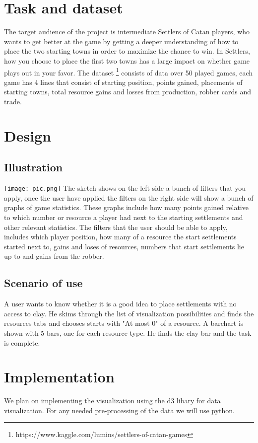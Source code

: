 \documentclass{article}
\begin{document}
\section{Task and dataset}

The target audience of the project is intermediate Settlers of Catan
players, who wants to get better at the game by getting a deeper understanding
of how to place the two starting towns in order to maximize the chance
to win. In Settlers, how you choose to place the first two towns has
a large impact on whether game plays out in your favor. The dataset
\footnote{https://www.kaggle.com/lumins/settlers-of-catan-games} consists of
data over 50 played games, each game has 4 lines that consist of starting
position, points gained, placements of starting towns, total resource gains
and losses from production, robber cards and trade.

\section{Design}

\subsection{Illustration}
\texttt{[image: pic.png]}
\newpage
\noindent
The sketch shows on the left side a bunch of filters that you apply, once the user
have applied the filters on the right side will show a bunch of graphs of game statistics.
These graphs include how many points gained relative to which number or resource a player
had next to the starting settlements and other relevant statistics.
The filters that the user should be able to apply, includes which player position,
how many of a resource the start settlements started next to, gains and loses of resources,
numbers that start settlements lie up to and gains from the robber.

\subsection{Scenario of use}

A user wants to know whether it is a good idea to place settlements with no
access to clay. He skims through the list of visualization possibilities
and finds the resources tabs and chooses starts with "At most 0" of a
resource. A barchart is shown with 5 bars, one for each resource type. He
finds the clay bar and the task is complete.

\section{Implementation}
We plan on implementing the visualization using the d3 libary for data visualization.
For any needed pre-processing of the data we will use python.
\end{document}
